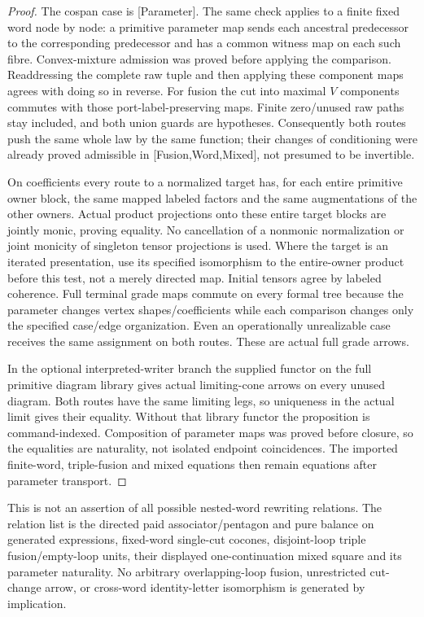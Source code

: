 \documentclass[11pt]{article}
\begin{document}
\begin{proof}
The cospan case is [Parameter]. The same check applies to a finite fixed word node by node: a primitive parameter map sends each ancestral predecessor to the corresponding predecessor and has a common witness map on each such fibre. Convex-mixture admission was proved before applying the comparison. Readdressing the complete raw tuple and then applying these component maps agrees with doing so in reverse. For fusion the cut into maximal $V$ components commutes with those port-label-preserving maps. Finite zero/unused raw paths stay included, and both union guards are hypotheses. Consequently both routes push the same whole law by the same function; their changes of conditioning were already proved admissible in [Fusion,Word,Mixed], not presumed to be invertible.

On coefficients every route to a normalized target has, for each entire primitive owner block, the same mapped labeled factors and the same augmentations of the other owners. Actual product projections onto these entire target blocks are jointly monic, proving equality. No cancellation of a nonmonic normalization or joint monicity of singleton tensor projections is used. Where the target is an iterated presentation, use its specified isomorphism to the entire-owner product before this test, not a merely directed map. Initial tensors agree by labeled coherence. Full terminal grade maps commute on every formal tree because the parameter changes vertex shapes/coefficients while each comparison changes only the specified case/edge organization. Even an operationally unrealizable case receives the same assignment on both routes. These are actual full grade arrows.

In the optional interpreted-writer branch the supplied functor on the full primitive diagram library gives actual limiting-cone arrows on every unused diagram. Both routes have the same limiting legs, so uniqueness in the actual limit gives their equality. Without that library functor the proposition is command-indexed. Composition of parameter maps was proved before closure, so the equalities are naturality, not isolated endpoint coincidences. The imported finite-word, triple-fusion and mixed equations then remain equations after parameter transport.
\end{proof}

This is not an assertion of all possible nested-word rewriting relations. The relation list is the directed paid associator/pentagon and pure balance on generated expressions, fixed-word single-cut cocones, disjoint-loop triple fusion/empty-loop units, their displayed one-continuation mixed square and its parameter naturality. No arbitrary overlapping-loop fusion, unrestricted cut-change arrow, or cross-word identity-letter isomorphism is generated by implication.
\end{document}
